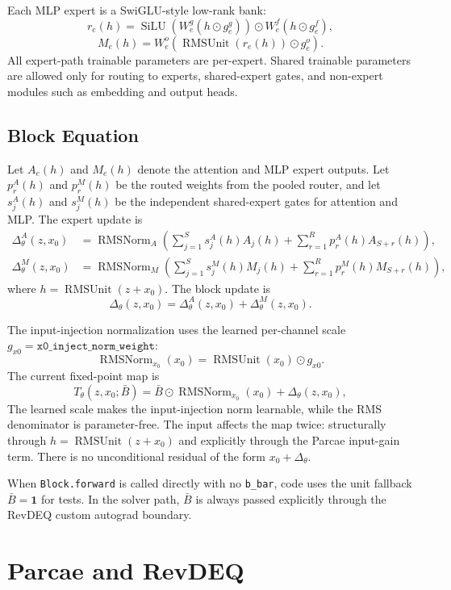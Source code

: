 \documentclass[11pt]{article}
\newcommand{\RMSUnit}{\operatorname{RMSUnit}}
\newcommand{\RMSNorm}{\operatorname{RMSNorm}}
\newcommand{\silu}{\operatorname{SiLU}}
\begin{document}
Each MLP expert is a SwiGLU-style low-rank bank:
\[
  r_e(h) = \silu(W^g_e(h\odot g^g_e))\odot W^f_e(h\odot g^f_e),
\]
\[
  M_e(h)= W^o_e\!\left(\RMSUnit(r_e(h))\odot g^o_e\right).
\]
All expert-path trainable parameters are per-expert.  Shared trainable
parameters are allowed only for routing to experts, shared-expert gates, and
non-expert modules such as embedding and output heads.

\subsection{Block Equation}
\label{sec:block}

Let $A_e(h)$ and $M_e(h)$ denote the attention and MLP expert outputs.  Let
$p^A_r(h)$ and $p^M_r(h)$ be the routed weights from the pooled router, and let
$s^A_j(h)$ and $s^M_j(h)$ be the independent shared-expert gates for attention
and MLP.  The expert update is
\[
\begin{aligned}
  \Delta^A_\theta(z,x_0)
    &= \RMSNorm_A\!\left(
      \sum_{j=1}^{S} s^A_j(h) A_j(h)
      + \sum_{r=1}^{R} p^A_r(h) A_{S+r}(h)
    \right),\\
  \Delta^M_\theta(z,x_0)
    &= \RMSNorm_M\!\left(
      \sum_{j=1}^{S} s^M_j(h) M_j(h)
      + \sum_{r=1}^{R} p^M_r(h) M_{S+r}(h)
    \right),
\end{aligned}
\]
where $h=\RMSUnit(z+x_0)$.  The block update is
\[
  \Delta_\theta(z,x_0)=\Delta^A_\theta(z,x_0)+\Delta^M_\theta(z,x_0).
\]

The input-injection normalization uses the learned per-channel scale
$g_{x0}=\texttt{x0\_inject\_norm\_weight}$:
\[
  \RMSNorm_{x_0}(x_0)=\RMSUnit(x_0)\odot g_{x0}.
\]
The current fixed-point map is
\begin{equation}
  T_\theta(z,x_0;\bar B)
    = \bar B \odot \RMSNorm_{x_0}(x_0)
      + \Delta_\theta(z,x_0),
  \label{eq:Tx_new}
\end{equation}
The learned scale makes the input-injection norm learnable, while the RMS
denominator is parameter-free.  The input affects the map twice: structurally
through $h=\RMSUnit(z+x_0)$ and explicitly through the Parcae input-gain term.
There is no unconditional residual of the form $x_0+\Delta_\theta$.

When \texttt{Block.forward} is called directly with no \texttt{b\_bar}, code
uses the unit fallback $\bar B=\mathbf{1}$ for tests.  In the solver path,
$\bar B$ is always passed explicitly through the RevDEQ custom autograd
boundary.

\section{Parcae and RevDEQ}
\label{sec:algorithm}
\end{document}
